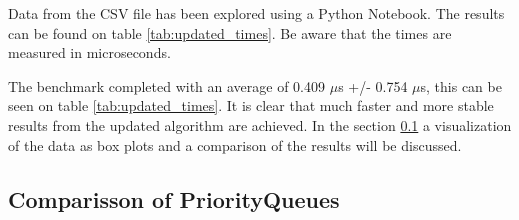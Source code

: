 \documentclass{article}
\begin{document}
Data from the CSV file has been explored using a Python Notebook. 
The results can be found on table \ref{tab:updated_times}. Be aware that the times are measured in microseconds. 

The benchmark completed with an average of 0.409 $\mu$s +/- 0.754 $\mu$s, this can be seen on table \ref{tab:updated_times}.
It is clear that much faster and more stable results from the updated algorithm are achieved. 
In the section \ref{sec:comparisson_of_priorityqueues} a visualization of the data as 
box plots and a comparison of the results will be discussed.


\subsection{Comparisson of PriorityQueues} %
\label{sec:comparisson_of_priorityqueues}
\end{document}
